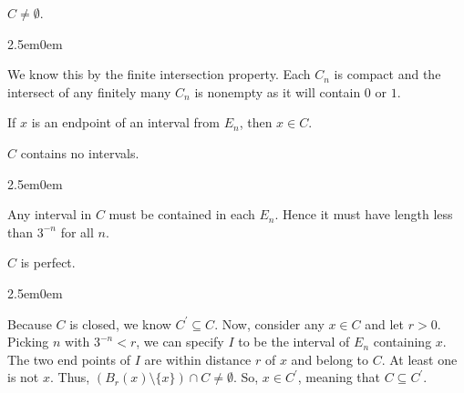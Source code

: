 \documentclass{book}
\newcommand{\hTwo}{%
   \color{MidnightBlue}%
   \fontsize{13}{15}\selectfont%
}
\newenvironment{myIndent}{%
   \begin{adjustwidth}{2.5em}{0em}%
}{%
   \end{adjustwidth}%
}
\newcommand{\retTwo}{\hfill\bigbreak}
\begin{document}
   $C \neq \emptyset$.
   {\begin{myIndent} \hTwo
      We know this by the finite intersection property. Each $C_n$ is compact and the\\ intersect of any finitely many $C_n$ is nonempty as it will contain $0$ or $1$. \retTwo
   \end{myIndent}}

   If $x$ is an endpoint of an interval from $E_n$, then $x \in C$. \retTwo

   $C$ contains no intervals.
   
   {\begin{myIndent} \hTwo
      Any interval in $C$ must be contained in each $E_n$. Hence it must have length less than $3^{-n}$ for all $n$. \retTwo
   \end{myIndent}}

   $C$ is perfect.
   {\begin{myIndent} \hTwo
      Because $C$ is closed, we know $C^\prime \subseteq C$. Now, consider any $x \in C$ and let $r>0$. Picking $n$ with $3^{-n} < r$, we can specify $I$ to be the interval of $E_n$ containing $x$. The two end points of $I$ are within distance $r$ of $x$ and belong to $C$. At least one is not $x$. Thus, $(B_r(x) \setminus \{x\})\cap C \neq \emptyset$. So, $x \in C^\prime$, meaning that $C \subseteq C^\prime$.
   \end{myIndent}}

   \newpage
\end{document}
